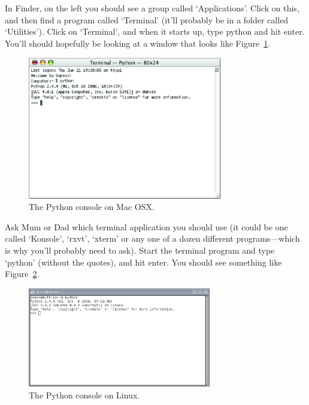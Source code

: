 \begin{MAC}
In Finder, on the left you should see a group called `Applications'.  Click on this, and then find a program called `Terminal' (it'll probably be in a folder called `Utilities').
Click on `Terminal', and when it starts up, type python and hit enter.  You'll should hopefully be looking at a window that looks like Figure~\ref{fig3}.

\begin{figure}
\begin{center}
\includegraphics[width=85mm]{eps/figure3.eps}
\end{center}
\caption{The Python console on Mac OSX.}\label{fig3}
\end{figure}
\end{MAC}

\begin{LINUX}
Ask Mum or Dad which terminal application you should use (it could be one called `Konsole', `rxvt', `xterm' or any one of a dozen different programs---which is why you'll probably need to ask).  Start the terminal program and type `python' (without the quotes), and hit enter.  You should see something like Figure~\ref{fig4}.

\begin{figure}
\begin{center}
\includegraphics[width=80mm]{eps/figure4.eps}
\end{center}
\caption{The Python console on Linux.}\label{fig4}
\end{figure}
\end{LINUX}

